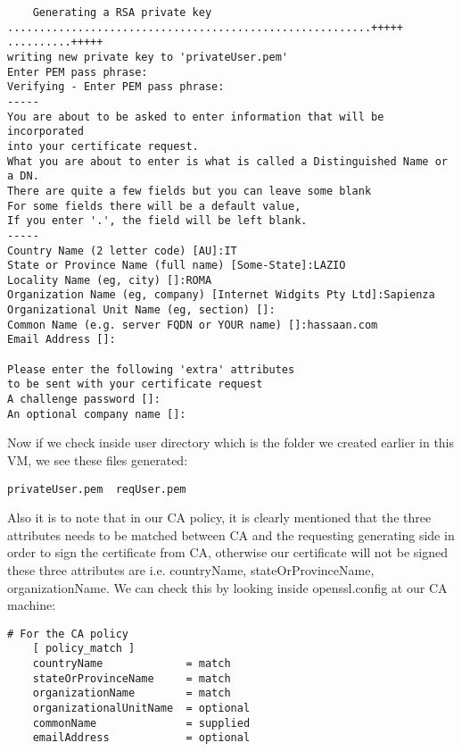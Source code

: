 \documentclass[11pt]{article}
\begin{document}
\begin{verbatim}
	Generating a RSA private key
.........................................................+++++
..........+++++
writing new private key to 'privateUser.pem'
Enter PEM pass phrase:
Verifying - Enter PEM pass phrase:
-----
You are about to be asked to enter information that will be incorporated
into your certificate request.
What you are about to enter is what is called a Distinguished Name or a DN.
There are quite a few fields but you can leave some blank
For some fields there will be a default value,
If you enter '.', the field will be left blank.
-----
Country Name (2 letter code) [AU]:IT
State or Province Name (full name) [Some-State]:LAZIO
Locality Name (eg, city) []:ROMA
Organization Name (eg, company) [Internet Widgits Pty Ltd]:Sapienza    
Organizational Unit Name (eg, section) []:
Common Name (e.g. server FQDN or YOUR name) []:hassaan.com
Email Address []:

Please enter the following 'extra' attributes
to be sent with your certificate request
A challenge password []:
An optional company name []:

\end{verbatim}

Now if we check inside user directory which is the folder we created earlier in this VM, we see these files generated:

\begin{verbatim}
privateUser.pem  reqUser.pem
\end{verbatim}

Also it is to note that in our CA policy, it is clearly mentioned that the three attributes needs to be matched between CA and the requesting generating side in order to sign the certificate from CA, otherwise our certificate will not be signed these three attributes are i.e. countryName, stateOrProvinceName, organizationName. We can check this by looking inside openssl.config at our CA machine:

\begin{verbatim}
# For the CA policy
	[ policy_match ]
	countryName             = match
	stateOrProvinceName     = match
	organizationName        = match
	organizationalUnitName  = optional
	commonName              = supplied
	emailAddress            = optional

\end{verbatim}
\end{document}
